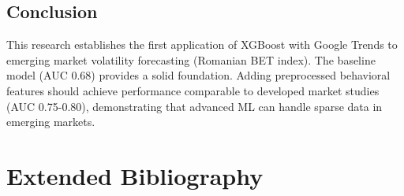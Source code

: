 \documentclass[12pt,a4paper]{article}
\begin{document}
\subsection{Conclusion}

This research establishes the first application of XGBoost with Google Trends to emerging market volatility forecasting (Romanian BET index). The baseline model (AUC 0.68) provides a solid foundation. Adding preprocessed behavioral features should achieve performance comparable to developed market studies (AUC 0.75-0.80), demonstrating that advanced ML can handle sparse data in emerging markets.

\newpage
\section{Extended Bibliography}
\end{document}
